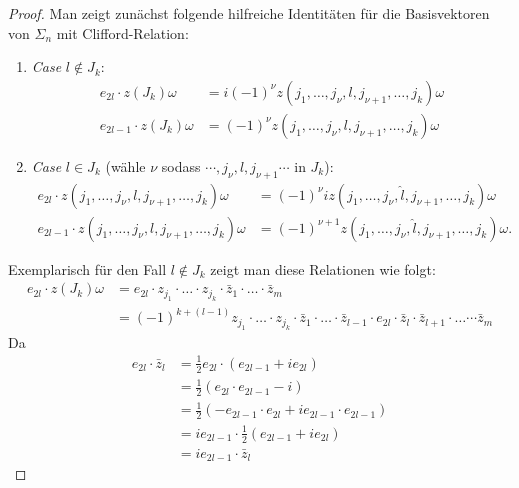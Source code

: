 \documentclass[10pt, letterpaper]{article}
\begin{document}
\begin{proof}
    Man zeigt zunächst folgende hilfreiche Identitäten für die Basisvektoren von $\Sigma_n$ mit Clifford-Relation:
    \begin{enumerate}
    \item \emph{Case} $l \notin J_k$: 
    $$
    \begin{aligned}
      e_{2 l} \cdot z\left(J_k\right)\omega &=i(-1)^\nu z\left(j_1, \ldots, j_\nu, l, j_{\nu+1}, \ldots, j_k\right)\omega \\
      e_{2 l-1} \cdot z\left(J_k\right)\omega & = (-1)^\nu z\left(j_1, \ldots, j_\nu, l, j_{\nu+1}, \ldots, j_k\right)\omega
    \end{aligned}
    $$
    \item \emph{Case} $l \in J_k$ (wähle $\nu$ sodass $\cdots,j_\nu ,l,j_{\nu+1}\cdots$ in $J_k$):  
    $$
    \begin{aligned}
      e_{2 l} \cdot z\left(j_1, \ldots, j_\nu, l, j_{\nu+1}, \ldots, j_k\right)\omega&=(-1)^\nu i z\left(j_1, \ldots, j_\nu,\hat{l}, j_{\nu+1}, \ldots, j_k\right)\omega\\
      e_{2 l-1} \cdot z\left(j_1, \ldots, j_\nu, l, j_{\nu+1}, \ldots, j_k\right)\omega&=(-1)^{\nu+1} z\left(j_1, \ldots, j_\nu,\hat{l}, j_{\nu+1}, \ldots, j_k\right)\omega .
    \end{aligned}
    $$
    \end{enumerate}
    Exemplarisch für den Fall $l\notin J_k$ zeigt man diese Relationen wie folgt:
    $$
    \begin{aligned}
    e_{2 l} \cdot z\left(J_k\right)\omega & =e_{2 l} \cdot z_{j_1} \cdot \ldots \cdot z_{j_k} \cdot \bar{z}_1 \cdot \ldots \cdot \bar{z}_m \\
    & =(-1)^{k+(l-1)} z_{j_1} \cdot \ldots \cdot z_{j_k} \cdot \bar{z}_1 \cdot \ldots \cdot \bar{z}_{l-1} \cdot e_{2 l} \cdot \bar{z}_l \cdot \bar{z}_{l+1} \cdot \ldots \cdots \bar{z}_m
    \end{aligned}
    $$
    Da
    $$
    \begin{aligned}
    e_{2 l} \cdot \bar{z}_l & =\frac{1}{2} e_{2 l} \cdot\left(e_{2 l-1}+i e_{2 l}\right) \\
    & =\frac{1}{2}\left(e_{2 l} \cdot e_{2 l-1}-i\right) \\
    & =\frac{1}{2}\left(-e_{2 l-1} \cdot e_{2 l}+i e_{2 l-1} \cdot e_{2 l-1}\right) \\
    & =i e_{2 l-1} \cdot \frac{1}{2}\left(e_{2 l-1}+i e_{2 l}\right) \\
    & =i e_{2 l-1} \cdot \bar{z}_l

\end{aligned}$$
\end{proof}
\end{document}
